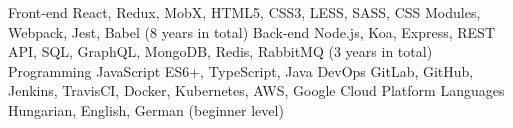 

\begin{cvskills}

  \cvskill
    {Front-end} %
    {React, Redux, MobX, HTML5, CSS3, LESS, SASS, CSS Modules, Webpack, Jest, Babel (8 years in total)} %
  \cvskill
    {Back-end} %
    {Node.js, Koa, Express, REST API, SQL, GraphQL, MongoDB, Redis, RabbitMQ (3 years in total)} %
  \cvskill
    {Programming} %
    {JavaScript ES6+, TypeScript, Java} %
  \cvskill
    {DevOps} %
    {GitLab, GitHub, Jenkins, TravisCI, Docker, Kubernetes, AWS, Google Cloud Platform} %
  \cvskill
    {Languages} %
    {Hungarian, English, German (beginner level)} %

\end{cvskills}

